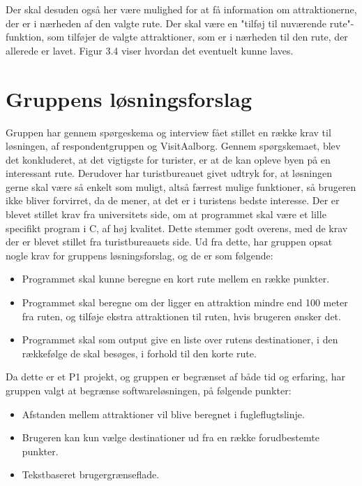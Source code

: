 Der skal desuden også her være mulighed for at få information om attraktionerne, der er i nærheden af den valgte rute. Der skal være en "tilføj til nuværende rute"-funktion, som tilføjer de valgte attraktioner, som er i nærheden til den rute, der allerede er lavet. Figur 3.4 viser hvordan det eventuelt kunne laves. \newline
\newline
\newline
\newline
\newline
\newline
\newline
\newline
\newline


\section{Gruppens løsningsforslag}
Gruppen har gennem spørgeskema og interview fået stillet en række krav til løsningen, af respondentgruppen og VisitAalborg. 
Gennem spørgskemaet, blev det konkluderet, at det vigtigste for turister, er at de kan opleve byen på en interessant rute. 
Derudover har turistbureauet givet udtryk for, at løsningen gerne skal være så enkelt som muligt, altså færrest mulige funktioner, så brugeren ikke bliver forvirret, da de mener, at det er i turistens bedste interesse. \newline
Der er blevet stillet krav fra universitets side, om at programmet skal være et lille specifikt program i C, af høj kvalitet. Dette stemmer godt overens, med de krav der er blevet stillet fra turistbureauets side.   \newline
Ud fra dette, har gruppen opsat nogle krav for gruppens løsningsforslag, og de er som følgende:
\begin{itemize}
	\item Programmet skal kunne beregne en kort rute mellem en række punkter.
	\item Programmet skal beregne om der ligger en attraktion mindre end 100 meter fra ruten, og tilføje ekstra attraktionen til ruten, hvis brugeren ønsker det.
	\item Programmet skal som output give en liste over rutens destinationer, i den rækkefølge de skal besøges, i forhold til den korte rute.
\end{itemize}

Da dette er et P1 projekt, og gruppen er begrænset af både tid og erfaring, har gruppen valgt at begrænse softwareløsningen, på følgende punkter: 
\begin{itemize}
	\item Afstanden mellem attraktioner vil blive beregnet i fugleflugtslinje.
	\item Brugeren kan kun vælge destinationer ud fra en række forudbestemte punkter.
	\item Tekstbaseret brugergrænseflade.
\end{itemize}

